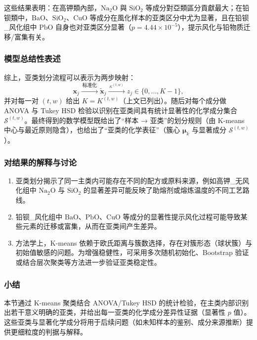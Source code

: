\documentclass[withoutpreface,bwprint]{cumcmthesis}
\begin{document}
这些结果表明：在高钾類內部，$\mathrm{Na_2O}$ 與 $\mathrm{SiO_2}$ 等成分對亞類區分貢獻最大；在铅钡類中，$\mathrm{BaO}$、$\mathrm{SiO_2}$、$\mathrm{CuO}$ 等成分在風化样本的亚类区分中尤为显著，且在铅钡\_风化组中 $\mathrm{PbO}$ 自身也对亚类区分显著（$p=4.44\times10^{-5}$），提示风化与铅物质迁移/富集有关。

\subsubsection{模型总结性表述}
综上，亚类划分流程可以表示为两步映射：
\[
\mathbf{x}_j \xrightarrow{\ \text{标准化}\ } \tilde{\mathbf{x}}_j
\xrightarrow{\ \kappa^{(t,w)}\ } z_j \in \{0,\dots,K-1\},
\]
并对每一对 $(t,w)$ 给出 $K=K^{(t,w)}$（上文已列出）。随后对每个成分做 ANOVA 与 Tukey HSD 检验以识别在亚类间具有统计显著性的化学成分集合 $\mathcal{S}^{(t,w)}$。最终得到的数学模型既给出了“样本 → 亚类”的划分规则（由 K-means 中心与最近原则隐含），也给出了“亚类的化学表征”（簇心 $\boldsymbol{\mu}_k$ 与显著成分 $\mathcal{S}^{(t,w)}$）。

\subsubsection{对结果的解释与讨论}
\begin{enumerate}
    \item 亚类划分揭示了同一主类内可能存在不同的配方或原料来源，例如高钾\_无风化组中 $\mathrm{Na_2O}$ 与 $\mathrm{SiO_2}$ 的显著差异可能反映了助熔剂或熔炼温度的不同工艺路线。
    \item 铅钡\_风化组中 $\mathrm{BaO}$、$\mathrm{PbO}$、$\mathrm{CuO}$ 等成分的显著性提示风化过程可能导致某些元素的迁移或富集，从而在亚类间产生差异。
    \item 方法学上，K-means 依赖于欧氏距离与簇数选择，存在对簇形态（球状簇）与初始值敏感的问题。为增强稳健性，可采用多次随机初始化、Bootstrap 验证或结合层次聚类等方法进一步验证亚类稳定性。
\end{enumerate}

\subsubsection{小结}
本节通过 K-means 聚类结合 ANOVA/Tukey HSD 的统计检验，在主类内部识别出若干意义明确的亚类，并给出每一亚类的化学成分差异性证据（显著性 $p$ 值）。这些亚类与显著化学成分将用于后续问题（如未知样本的鉴别、成分来源推断）提供更细粒度的判据与解释。

\end{document}

